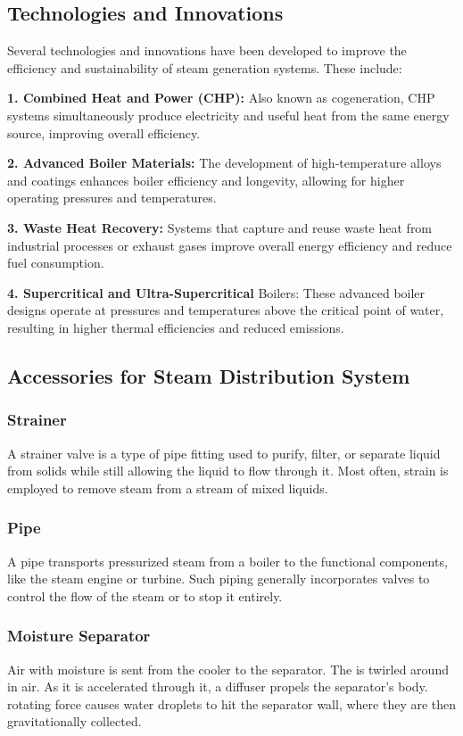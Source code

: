 \newpage
\subsection{Technologies and Innovations}
Several technologies and innovations have been developed to improve the efficiency and sustainability of steam generation systems. These include:

\textbf{1. Combined Heat and Power (CHP):} Also known as cogeneration, CHP systems simultaneously produce electricity and useful heat from the same energy source, improving overall efficiency.

\textbf{2. Advanced Boiler Materials:} The development of high-temperature alloys and coatings enhances boiler efficiency and longevity, allowing for higher operating pressures and temperatures.

\textbf{3. Waste Heat Recovery:} Systems that capture and reuse waste heat from industrial processes or exhaust gases improve overall energy efficiency and reduce fuel consumption.

\textbf{4. Supercritical and Ultra-Supercritical }Boilers: These advanced boiler designs operate at pressures and temperatures above the critical point of water, resulting in higher thermal efficiencies and reduced emissions.

\subsection{Accessories for Steam Distribution System}

\subsubsection{Strainer}
A strainer valve is a type of pipe fitting used to purify, filter, or separate liquid from solids while still allowing the liquid to flow through it. Most often, strain is employed to remove steam from a stream of mixed liquids.

\subsubsection{Pipe}
A pipe transports pressurized steam from a boiler to the functional components, like the steam engine or turbine. Such piping generally incorporates valves to control the flow of the steam or to stop it entirely.

\subsubsection{Moisture Separator}
Air with moisture is sent from the cooler to the separator. The is twirled around in air. As it is accelerated through it, a diffuser propels the separator's body. rotating force causes water droplets to hit the separator wall, where they are then gravitationally collected.

